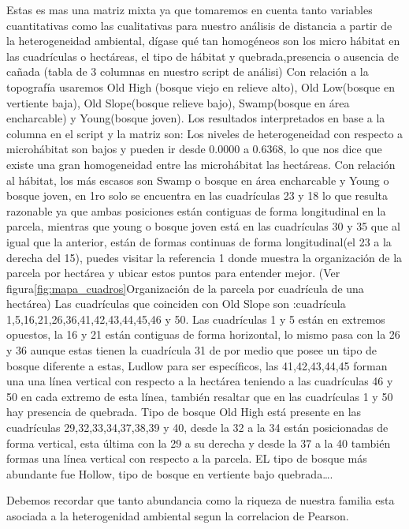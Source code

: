 \documentclass[11pt,]{article}
\begin{document}
Estas es mas una matriz mixta ya que tomaremos en cuenta tanto variables
cuantitativas como las cualitativas para nuestro análisis de distancia a
partir de la heterogeneidad ambiental, dígase qué tan homogéneos son los
micro hábitat en las cuadrículas o hectáreas, el tipo de hábitat y
quebrada,presencia o ausencia de cañada (tabla de 3 columnas en nuestro
script de análisi) Con relación a la topografía usaremos Old High
(bosque viejo en relieve alto), Old Low(bosque en vertiente baja), Old
Slope(bosque relieve bajo), Swamp(bosque en área encharcable) y
Young(bosque joven). Los resultados interpretados en base a la columna
en el script y la matriz son: Los niveles de heterogeneidad con respecto
a microhábitat son bajos y pueden ir desde 0.0000 a 0.6368, lo que nos
dice que existe una gran homogeneidad entre las microhábitat las
hectáreas. Con relación al hábitat, los más escasos son Swamp o bosque
en área encharcable y Young o bosque joven, en 1ro solo se encuentra en
las cuadrículas 23 y 18 lo que resulta razonable ya que ambas posiciones
están contiguas de forma longitudinal en la parcela, mientras que young
o bosque joven está en las cuadrículas 30 y 35 que al igual que la
anterior, están de formas continuas de forma longitudinal(el 23 a la
derecha del 15), puedes visitar la referencia 1 donde muestra la
organización de la parcela por hectárea y ubicar estos puntos para
entender mejor. (Ver figura\ref{fig:mapa_cuadros}Organización de la
parcela por cuadrícula de una hectárea) Las cuadrículas que coinciden
con Old Slope son :cuadrícula 1,5,16,21,26,36,41,42,43,44,45,46 y 50.
Las cuadrículas 1 y 5 están en extremos opuestos, la 16 y 21 están
contiguas de forma horizontal, lo mismo pasa con la 26 y 36 aunque estas
tienen la cuadrícula 31 de por medio que posee un tipo de bosque
diferente a estas, Ludlow para ser específicos, las 41,42,43,44,45
forman una una línea vertical con respecto a la hectárea teniendo a las
cuadrículas 46 y 50 en cada extremo de esta línea, también resaltar que
en las cuadrículas 1 y 50 hay presencia de quebrada. Tipo de bosque Old
High está presente en las cuadrículas 29,32,33,34,37,38,39 y 40, desde
la 32 a la 34 están posicionadas de forma vertical, esta última con la
29 a su derecha y desde la 37 a la 40 también formas una línea vertical
con respecto a la parcela. EL tipo de bosque más abundante fue Hollow,
tipo de bosque en vertiente bajo quebrada\ldots{}.

Debemos recordar que tanto abundancia como la riqueza de nuestra familia
esta asociada a la heterogenidad ambiental segun la correlacion de
Pearson.
\end{document}
